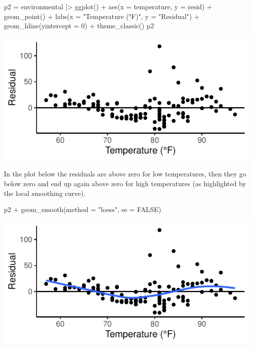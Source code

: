 \documentclass[a4paper]{article}
\begin{document}
\hspace{0.02\textwidth}
\begin{minipage}[t]{0.49\textwidth}
\begin{Schunk}
\begin{Sinput}
p2 = environmental |> ggplot() + 
  aes(x = temperature, y = resid) + 
  geom_point() + 
  labs(x = "Temperature (°F)",
       y = "Residual") +
  geom_hline(yintercept = 0) +
  theme_classic()
p2
\end{Sinput}


{\centering \includegraphics[width=\maxwidth]{figure/listings-unnamed-chunk-344-1} 

}

\end{Schunk}
\end{minipage}
In the plot below the residuals are above zero for low temperatures, then they go below zero and end up again above zero for high temperatures (as highlighted by the local smoothing curve).\\
\begin{minipage}[m]{0.49\textwidth}
\begin{Schunk}
\begin{Sinput}
p2 + geom_smooth(method = "loess", 
                 se = FALSE)
\end{Sinput}


{\centering \includegraphics[width=\maxwidth]{figure/listings-unnamed-chunk-345-1} 

}

\end{Schunk}
\end{minipage}
\end{document}
